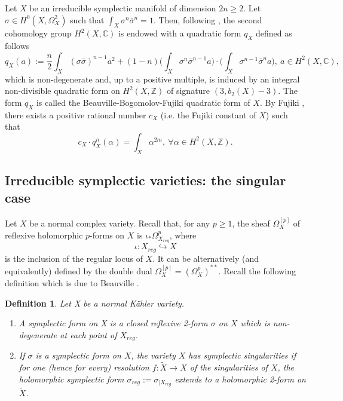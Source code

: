 \documentclass[12pt,reqno]{amsart}
\def\tilde{\widetilde}
\newtheorem{definition}[thm]{Definition}
\theoremstyle{plain}
\theoremstyle{definition}
\begin{document}
Let $X$ be an irreducible symplectic manifold of dimension $2n \geq 2$. Let $\sigma\in H^0(X,\Omega^2_X)$ such that 
$\int_{ X} \sigma^n \bar{\sigma}^{n}=1$.
Then, following \cite{Beau84},  the second cohomology group $H^2(X,\mathbb C)$ is endowed with a  quadratic form $q_{X}$ defined as follows
 $$
 q_{X}(a):=\frac{n}{2}\int_{ X} ( \sigma \bar{ \sigma})^{n-1}a^2 +
 (1-n)\bigg(\int_{ X} \sigma^n \bar{\sigma}^{n-1}a \bigg)\cdot
 \bigg(\int_{ X} \sigma^{n-1} \bar{ \sigma}^{n}a\bigg),\ a\in H^2(X,\mathbb C),
 $$
 which is non-degenerate and, up to a positive multiple, is induced by an integral non-divisible quadratic form on $H^2(X,\mathbb Z)$
 of signature $(3, b_{2}(X)-3)$. The form $q_X$ is called the Beauville-Bogomolov-Fujiki quadratic form of $X$. 
By Fujiki \cite{F},  there exists a positive rational number $c_X$ (i.e. the Fujiki constant of $X$) such that
$$c_X \cdot q_X^{n}(\alpha) = \int_{X}\alpha^{2m},\ \forall \alpha \in H^2(X,\mathbb Z).$$

\subsection{Irreducible symplectic varieties: the singular case}
Let $X$ be a normal complex variety.
Recall that, for any $p\geq 1$, the sheaf $\Omega_X^{[p]}$ of reflexive holomorphic $p$-forms on $X$
is $\iota_* \Omega_{X_{reg}}^{p}$, where 
$$\iota : X_{reg}\hookrightarrow X$$
is the inclusion of the regular locus of $X$. 
It can be alternatively (and equivalently) defined by the double dual $\Omega_X^{[p]}=(\Omega_X^{p})^{**}$.
Recall the following definition which is due to Beauville \cite{Beau00}. 
\begin{definition}\label{def:symp-sing}
Let X be a normal K\"ahler  variety.
\begin{enumerate}
\item[i)] A symplectic form on X is a closed reflexive 2-form $\sigma$ on $X$
which is non-degenerate at each point of $X_{reg}$.
\item[ii)]  If $\sigma$ is a symplectic form on $X$, the variety $X$ has symplectic
singularities if for one (hence for every) resolution $f : \tilde X \to X$ of the singularities
of $X$, the holomorphic symplectic form $\sigma_{reg} :=\sigma_{|X_{reg}}$ extends to
a holomorphic 2-form on $\tilde X$.
\end{enumerate}
\end{definition}
\end{document}
